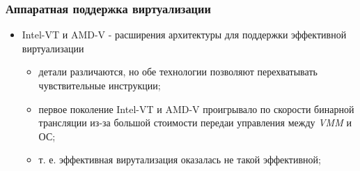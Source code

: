 \begin{frame}
\frametitle{Аппаратная поддержка виртуализации}
\begin{itemize}
  \item Intel-VT и AMD-V - расширения архитектуры для поддержки эффективной
        виртуализации
    \begin{itemize}
      \item детали различаются, но обе технологии позволяют перехватывать
            чувствительные инструкции;
      \item первое поколение Intel-VT и AMD-V проигрывало по скорости бинарной
            трансляции из-за большой стоимости передаи управления между
            \emph{VMM} и ОС;
      \item т. е. эффективная вирутализация оказалась не такой эффективной;
    \end{itemize}
\end{itemize}
\end{frame}
